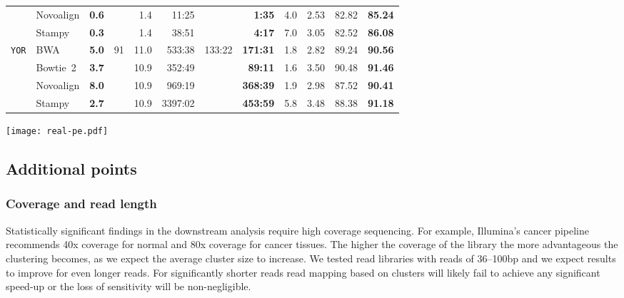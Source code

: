 \documentclass[a4paper]{article}
\begin{document}
\begin{table*}
\begin{tabular}{llcrrrrrccrr}
& \multirow{1}{*}{Novoalign} 	& {\bf 0.6} && 1.4 & 11:25 && {\bf 1:35} & 4.0 & 2.53 & 82.82 & {\bf 85.24} \\
& \multirow{1}{*}{Stampy}    	& {\bf 0.3} && 1.4 & 38:51 && {\bf 4:17} & 7.0 & 3.05 & 82.52 & {\bf 86.08}\\
\hline	
\multirow{4}{*}{\tt YOR}
& \multirow{1}{*}{BWA}       	& {\bf 5.0} &\multirow{4}{*}{91}& 11.0 & 533:38 &\multirow{4}{*}{133:22}& {\bf 171:31} & 1.8 & 2.82 & 89.24 & {\bf 90.56}\\
& \multirow{1}{*}{Bowtie~2}   	& {\bf 3.7} && 10.9 &  352:49 &&  {\bf 89:11} & 1.6 & 3.50 & 90.48 & {\bf 91.46}\\
& \multirow{1}{*}{Novoalign} 	& {\bf 8.0} && 10.9 &  969:19 && {\bf 368:39} & 1.9 & 2.98 & 87.52 & {\bf 90.41}\\
& \multirow{1}{*}{Stampy}    	& {\bf 2.7} && 10.9 & 3397:02 && {\bf 453:59} & 5.8 & 3.48 & 88.38 & {\bf 91.18}\\
\bottomrule 
\end{tabular}
    \end{table*}


    
    \begin{figure*}
  \centering
  \texttt{[image: real-pe.pdf]} 
  \caption{ \label{fig:real}
  {\bf Alternate mapping rate between clustered and individual paired-end read mapping.} Alternate mapping rate is shown as a function of MAPQ threshold. Maximum reported MAPQ value varies between readmappers; for BWA, Bowtie 2, Novoalign and Stampy maximum reported MAPQ for single-end reads are respectively 60, 42, 159 and 99. The cutoffs used to report alternate mapping rate in Table~\ref{runtime-pe} are shown with diamond signs in the inset figures.}
\end{figure*}





\subsection*{Additional points}

\subsubsection*{Coverage and read length} 
Statistically significant
findings in the downstream analysis require high coverage sequencing.
For example, Illumina's cancer pipeline recommends 40x coverage for
normal and 80x coverage for cancer tissues. The higher the coverage of
the library the more advantageous the clustering becomes, as we expect
the average cluster size to increase.  We tested read libraries with
reads of 36--100bp and we expect results to improve for even longer
reads. For significantly shorter reads read mapping based on clusters
will likely fail to achieve any significant speed-up or 
the loss of sensitivity will be non-negligible.
\end{document}
